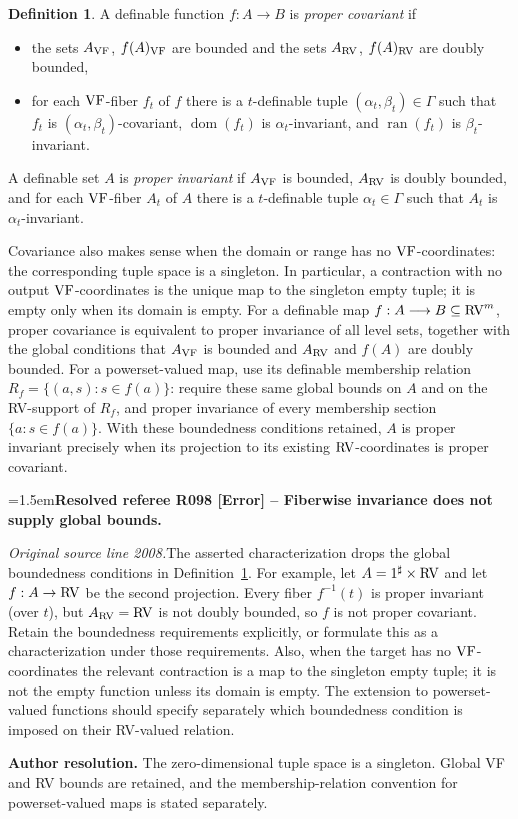 \documentclass[12pt]{amsart}
\newcommand{\ResolvedRefereeRemark}[5]{%
  \par\medskip\begingroup\normalfont\small\color{gray}%
  \emergencystretch=1.5em\noindent\textbf{Resolved referee R#1 [#2] -- #3.}\par\nobreak\noindent #4\par
  \medskip\color{ResolutionGreen}\noindent\textbf{Author resolution.} #5\par
  \endgroup\medskip
}
\newcommand{\memph}[1]{{\color{magenta}\emph{#1}}}
\theoremstyle{plain}
\theoremstyle{definition}
\newtheorem{defn}[thm]{Definition}
\theoremstyle{remark}
\numberwithin{equation}{section}
\theoremstyle{plain}
\newcommand{\VF}{\textup{VF}}
\newcommand{\RV}{\textup{RV}}
\DeclareMathOperator{\ran}{ran}
\DeclareMathOperator{\dom}{dom}
\newcommand{\0}{\emptyset}
\newcommand{\fun}{\longrightarrow}
\newcommand{\sub}{\subseteq}
\begin{document}
\begin{defn}\label{prop:pseu}
A definable function $f : A \fun B$ is \memph{proper covariant} if
\begin{itemize}
  \item the sets $A_{\VF}$, $f(A)_{\VF}$ are bounded and the sets $A_{\RV}$, $f(A)_{\RV}$ are  doubly bounded,
  \item for each $\VF$-fiber $f_{t}$ of $f$ there is a $t$-definable tuple $(\alpha_t, \beta_t) \in \Gamma$ such that $f_t$ is $(\alpha_{t}, \beta_{t})$-covariant, $\dom(f_{t})$ is $\alpha_t$-invariant, and $\ran(f_{t})$ is $\beta_t$-invariant.
\end{itemize}
A definable set $A$ is \memph{proper invariant}   if $A_{\VF}$ is bounded, $A_{\RV}$ is doubly bounded, and for each $\VF$-fiber $A_t$ of $A$ there is a $t$-definable tuple $\alpha_t\in \Gamma$ such that $A_t$ is $\alpha_t$-invariant.
\end{defn}

Covariance also makes sense when the domain or range has no $\VF$-coordinates: the corresponding tuple space is a singleton. In particular, a contraction with no output $\VF$-coordinates is the unique map to the singleton empty tuple; it is empty only when its domain is empty. For a definable map $f:A\fun B\sub\RV^m$, proper covariance is equivalent to proper invariance of all level sets, together with the global conditions that $A_{\VF}$ is bounded and $A_{\RV}$ and $f(A)$ are doubly bounded. For a powerset-valued map, use its definable membership relation $R_f=\{(a,s):s\in f(a)\}$: require these same global bounds on $A$ and on the RV-support of $R_f$, and proper invariance of every membership section $\{a:s\in f(a)\}$. With these boundedness conditions retained, $A$ is proper invariant precisely when its projection to its existing $\RV$-coordinates is proper covariant.

\ResolvedRefereeRemark{098}{Error}{Fiberwise invariance does not supply global bounds}{%
\textit{Original source line 2008.}\quad The asserted characterization drops the global boundedness conditions in Definition~\ref{prop:pseu}. For example, let $A=1^\sharp\times\RV$ and let $f:A\to\RV$ be the second projection. Every fiber $f^{-1}(t)$ is proper invariant (over $t$), but $A_{\RV}=\RV$ is not doubly bounded, so $f$ is not proper covariant. Retain the boundedness requirements explicitly, or formulate this as a characterization under those requirements. Also, when the target has no $\VF$-coordinates the relevant contraction is a map to the singleton empty tuple; it is not the empty function unless its domain is empty. The extension to powerset-valued functions should specify separately which boundedness condition is imposed on their RV-valued relation.
}{The zero-dimensional tuple space is a singleton. Global VF and RV bounds are retained, and the membership-relation convention for powerset-valued maps is stated separately.}
\end{document}
